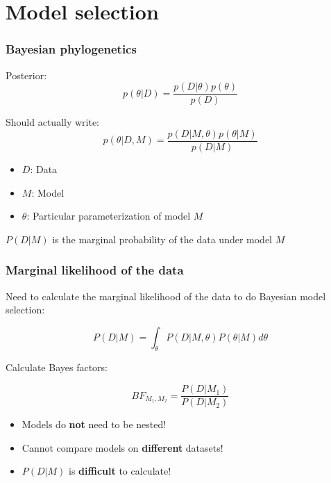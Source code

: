 \section{Model selection}

\begin{frame}\frametitle{Bayesian phylogenetics}

  Posterior:
  \[
      p(\theta | D) = \frac{p(D | \theta) p(\theta)}{p(D)}
  \]

  \pause

  Should actually write:
  \[
      p(\theta | D, M) = \frac{p(D | M, \theta) p(\theta | M)}{p(D | M)}
  \]

  \begin{itemize}
    \item $D$: Data
    \item $M$: Model
    \item $\theta$: Particular parameterization of model $M$
  \end{itemize}

  \vspace{0.5cm}

  \pause
  $P(D | M)$ is the marginal probability of the data under model $M$

\end{frame}


\begin{frame}\frametitle{Marginal likelihood of the data}

  Need to calculate the marginal likelihood of the data to do Bayesian model selection:

  \[
      P(D | M) = \int_\theta P(D | M, \theta)P(\theta | M) d\theta
  \]

  \pause
  Calculate Bayes factors:

  \[
      BF_{M_1,M_2} = \frac{P(D | M_1)}{P(D | M_2)}
  \]

  \pause
  \vspace{0.5cm}

  \begin{itemize}
    \item Models do \textbf{not} need to be nested!
    \item Cannot compare models on \textbf{different} datasets! 
    \item $P(D | M)$ is \textbf{difficult} to calculate!
  \end{itemize}

\end{frame}


